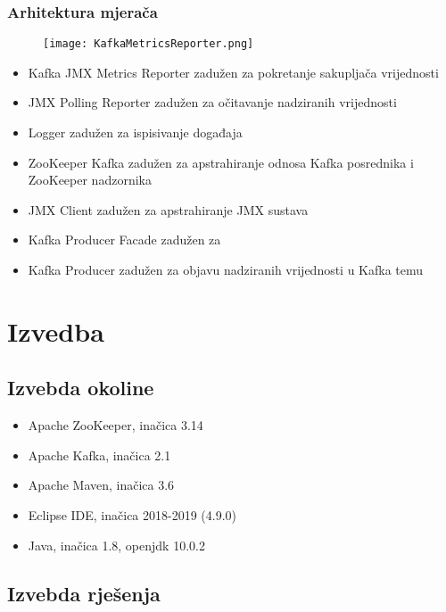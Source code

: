 \documentclass[times, utf8, diplomski, numeric]{fer}
\begin{document}
\subsection{Arhitektura mjerača}

\begin{figure}[H]
    \centering
    \texttt{[image: KafkaMetricsReporter.png]}
    \caption{}
    \label{fig:kafka-metrics-reporter}
\end{figure}

\begin{itemize}
    \item Kafka JMX Metrics Reporter zadužen za pokretanje sakupljača vrijednosti
    \item JMX Polling Reporter zadužen za očitavanje nadziranih vrijednosti
    \item Logger zadužen za ispisivanje događaja
    \item ZooKeeper Kafka zadužen za apstrahiranje odnosa Kafka posrednika i ZooKeeper nadzornika
    \item JMX Client zadužen za apstrahiranje JMX sustava
    \item Kafka Producer Facade zadužen za 
    \item Kafka Producer zadužen za objavu nadziranih vrijednosti u Kafka temu
\end{itemize}

\chapter{Izvedba}

\section{Izvebda okoline}

\begin{itemize}
    \item Apache ZooKeeper, inačica 3.14
    \item Apache Kafka, inačica 2.1
    \item Apache Maven, inačica 3.6
    \item Eclipse IDE, inačica 2018-2019 (4.9.0)
    \item Java, inačica 1.8, openjdk 10.0.2
\end{itemize}

\section{Izvebda rješenja}
\end{document}
